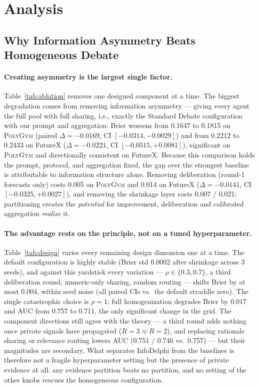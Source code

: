 \section{Analysis}
\label{sec:analysis}

\subsection{Why Information Asymmetry Beats Homogeneous Debate}
\label{sec:why}



\paragraph{ Creating asymmetry is the largest single factor.}
Table~\ref{tab:ablation} removes one designed component at a time.
The biggest degradation comes from removing information asymmetry --- giving every agent the full pool with full sharing, i.e., exactly the Standard Debate configuration with our prompt and aggregation: Brier worsens from 0.1647 to 0.1815 on \textsc{PolyGym} (paired $\Delta = -0.0169$, CI $[-0.0314, -0.0029]$) and from 0.2212 to 0.2433 on FutureX ($\Delta = -0.0221$, CI $[-0.0515, +0.0081]$), significant on \textsc{PolyGym} and directionally consistent on FutureX.
Because this comparison holds the prompt, protocol, and aggregation fixed, the gap over the strongest baseline is attributable to information structure alone.
Removing deliberation (round-1 forecasts only) costs 0.005 on \textsc{PolyGym} and 0.014 on FutureX ($\Delta = -0.0141$, CI $[-0.0325, +0.0027]$), and removing the shrinkage layer costs 0.007 / 0.021: partitioning creates the \emph{potential} for improvement, deliberation and calibrated aggregation \emph{realize} it.



\paragraph{ The advantage rests on the principle, not on a tuned hyperparameter.}
Table~\ref{tab:design} varies every remaining design dimension one at a time.
The default configuration is highly stable (Brier std $0.0002$ after shrinkage across 3 seeds), and against this yardstick every variation --- $\rho \in \{0.3, 0.7\}$, a third deliberation round, numeric-only sharing, random routing --- shifts Brier by at most $0.004$, within seed noise (all paired CIs vs.\ the default straddle zero).
The single catastrophic choice is $\rho{=}1$: full homogenization degrades Brier by $0.017$ and AUC from 0.757 to 0.711, the only significant change in the grid.
The component directions still agree with the theory --- a third round adds nothing once private signals have propagated ($R{=}3 \approx R{=}2$), and replacing rationale sharing or relevance routing lowers AUC (0.751 / 0.746 vs.\ 0.757) --- but their magnitudes are secondary.
What separates InfoDelphi from the baselines is therefore not a fragile hyperparameter setting but the presence of private evidence at all: any evidence partition beats no partition, and no setting of the other knobs rescues the homogeneous configuration.

